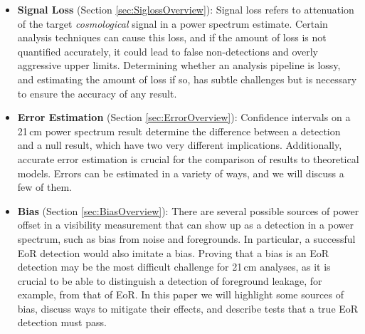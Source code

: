 \documentclass[preprint2,numberedappendix,tighten]{aastex6}  %
\begin{document}
\begin{itemize}
\item \textbf{Signal Loss} (Section \ref{sec:SiglossOverview}): Signal loss refers to attenuation of the target \textit{cosmological} signal 
in a power spectrum estimate. Certain analysis techniques can cause this loss, and if the amount of loss is not quantified accurately, it could lead to false non-detections and overly aggressive upper limits. Determining whether an analysis pipeline is lossy, and estimating the amount of loss if so, has subtle challenges but is necessary to ensure the accuracy of any result. 
\item \textbf{Error Estimation} (Section \ref{sec:ErrorOverview}): Confidence intervals on a 21\,cm power spectrum result 
determine the difference between a detection and a null result, which have two very different implications. Additionally, accurate error estimation is crucial for the comparison of results to theoretical models. Errors can be 
estimated in a variety of ways, and we will discuss a few of them.
\item \textbf{Bias} (Section \ref{sec:BiasOverview}): There are several possible sources of power offset in a visibility 
measurement that can show up as a detection in a power spectrum, such as bias from noise and foregrounds. In particular, a 
successful EoR detection would also imitate a bias. Proving that a bias is an EoR detection may be the most difficult challenge for 21\,cm 
analyses, as it is crucial to be able to distinguish a detection of foreground leakage, for example, from that of EoR. In this paper 
we will highlight some sources of bias, discuss ways to mitigate their effects, and describe tests that a true EoR detection must 
pass.
\end{itemize}

\end{document}
